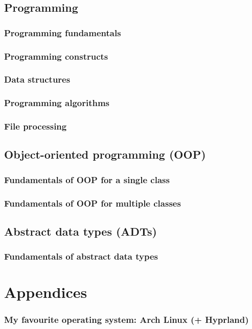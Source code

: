 \subsection{Programming}
\subsubsection{Programming fundamentals}
\subsubsection{Programming constructs}
\subsubsection{Data structures}
\subsubsection{Programming algorithms}
\subsubsection{File processing}
\subsection{Object-oriented programming (OOP)}
\subsubsection{Fundamentals of OOP for a single class}
\subsubsection{Fundamentals of OOP for multiple classes}
\subsection{Abstract data types (ADTs)}
\subsubsection{Fundamentals of abstract data types}
\newpage
\section{Appendices}
\subsubsection{My favourite operating system: Arch Linux (+ Hyprland)}
